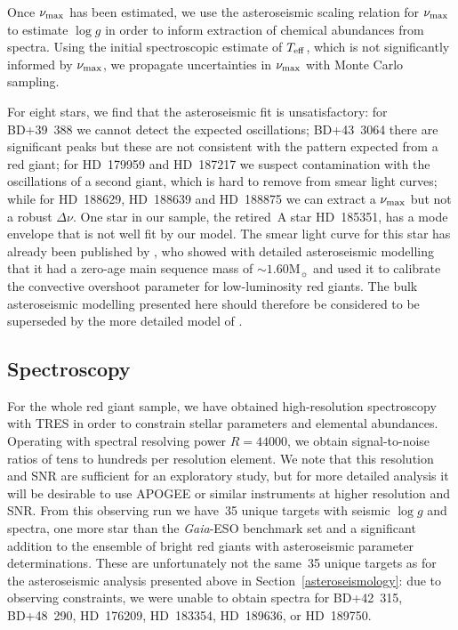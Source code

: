 \documentclass[a4paper,fleqn,usenatbib]{mnras}
\newcommand{\numax}{\mbox{$\nu_{\rm max}$}\xspace}
\newcommand{\Dnu}{\mbox{$\Delta \nu$}\xspace}
\newcommand{\teff}{\mbox{$T_{\rm eff}$}\xspace}
\newcommand{\logg}{\mbox{$\log g$}\xspace}
\newcommand{\msun}{\mbox{$\mathrm{M}_{\sun}$}\xspace}
\newcommand{\gaia}{\emph{Gaia}\xspace}
\begin{document}
Once \numax has been estimated, we use the asteroseismic scaling relation for \numax \citep[Equation~\ref{scaling};][]{KB95} to estimate \logg in order to inform extraction of chemical abundances from spectra. Using the initial spectroscopic estimate of \teff, which is not significantly informed by \numax, we propagate uncertainties in \numax with Monte Carlo sampling. 

For eight stars, we find that the asteroseismic fit is unsatisfactory: for BD+39~388 we cannot detect the expected oscillations; BD+43~3064 there are significant peaks but these are not consistent with the pattern expected from a red giant; for HD~179959 and HD~187217 we suspect contamination with the oscillations of a second giant, which is hard to remove from smear light curves; while for HD~188629, HD~188639 and HD~188875 we can extract a \numax but not a robust \Dnu. One star in our sample, the retired~A star HD~185351, has a mode envelope that is not well fit by our model. The smear light curve for this star has already been published by \citet{2017MNRAS.464.3713H}, who showed with detailed asteroseismic modelling that it had a zero-age main sequence mass of $\sim 1.60 \msun$ and used it to calibrate the convective overshoot parameter for low-luminosity red giants. The bulk asteroseismic modelling presented here should therefore be considered to be superseded by the more detailed model of \citet{2017MNRAS.464.3713H}. 



\subsection{Spectroscopy}
\label{spectroscopy}

For the whole red giant sample, we have obtained high-resolution spectroscopy with TRES in order to constrain stellar parameters and elemental abundances. Operating with spectral resolving power $R=44 000$, we obtain signal-to-noise ratios of tens to hundreds per resolution element. We note that this resolution and SNR are sufficient for an exploratory study, but for more detailed analysis it will be desirable to use APOGEE or similar instruments at higher resolution and SNR. From this observing run we have~35 unique targets with seismic \logg and spectra, one more star than the \gaia-ESO benchmark set and a significant addition to the ensemble of bright red giants with asteroseismic parameter determinations. These are unfortunately not the same~35 unique targets as for the asteroseismic analysis presented above in Section~\ref{asteroseismology}: due to observing constraints, we were unable to obtain spectra for BD+42~315, BD+48~290, HD~176209, HD~183354, HD~189636, or HD~189750.
\end{document}
